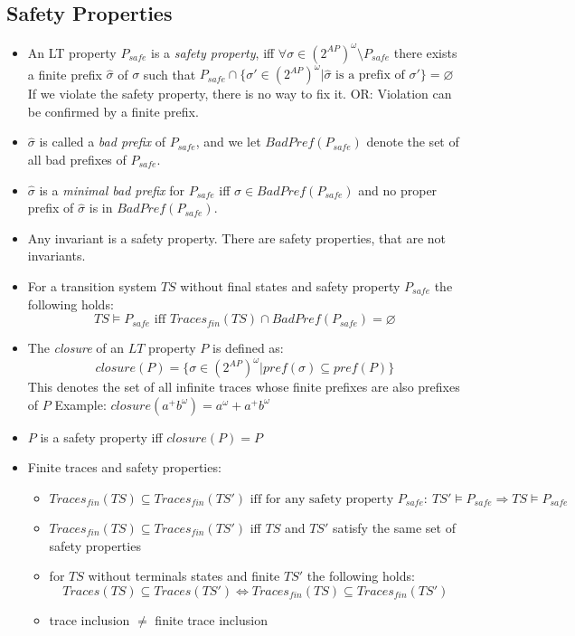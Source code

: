 \documentclass[a4paper, 10pt]{article}
\begin{document}
\subsection*{Safety Properties}
\begin{shaded}
    \begin{itemize}
        \item An LT property $P_{safe}$ is a \emph{safety property}, iff $\forall\sigma\in(2^{AP})^\omega\setminus P_{safe}$ there exists a finite prefix $\hat\sigma$ of $\sigma$ such that $P_{safe}\cap\{ \sigma'\in(2^{AP})^\omega | \hat\sigma \textrm{ is a prefix of } \sigma' \}=\varnothing$ \\{\tiny If we violate the safety property, there is no way to fix it. OR: Violation can be confirmed by a finite prefix.}
        \item $\hat\sigma$ is called a \emph{bad prefix} of $P_{safe}$, and we let $BadPref(P_{safe})$ denote the set of all bad prefixes of $P_{safe}$.
        \item $\hat\sigma$ is a \emph{minimal bad prefix} for $P_{safe}$ iff $\hat\sigma\in BadPref(P_{safe})$ and no proper prefix of $\hat\sigma$ is in $BadPref(P_{safe})$.
        \item Any invariant is a safety property. There are safety properties, that are not invariants.
        \item For a transition system $TS$ without final states and safety property $P_{safe}$ the following holds: \[ TS\models P_{safe} \textrm{ iff } Traces_{fin}(TS)\cap BadPref(P_{safe})=\varnothing \]
        \item The \emph{closure} of an $LT$ property $P$ is defined as: \[ closure(P)=\{ \sigma\in(2^{AP})^\omega | pref(\sigma) \subseteq pref(P) \} \]
        {\tiny This denotes the set of all infinite traces whose finite prefixes are also prefixes of $P$ Example: $closure(a^+b^\omega)=a^\omega+a^+b^\omega$}
        \item $P$ is a safety property iff $closure(P)=P$
    \end{itemize}
\end{shaded}
\begin{itemize}
    \item Finite traces and safety properties:
    \begin{itemize}
        \item $Traces_{fin}(TS)\subseteq Traces_{fin}(TS') \textrm{ iff for any safety property } P_{safe}:\ TS'\models P_{safe} \Rightarrow TS \models P_{safe}$
        \item $Traces_{fin}(TS)\subseteq Traces_{fin}(TS')$ iff $TS$ and $TS'$ satisfy the same set of safety properties
        \item for $TS$ without terminals states and finite $TS'$ the following holds: \[ Traces(TS) \subseteq Traces(TS') \iff Traces_{fin}(TS) \subseteq Traces_{fin}(TS') \]
        \item trace inclusion $\not=$ finite trace inclusion
    \end{itemize}
\end{itemize}
\end{document}
